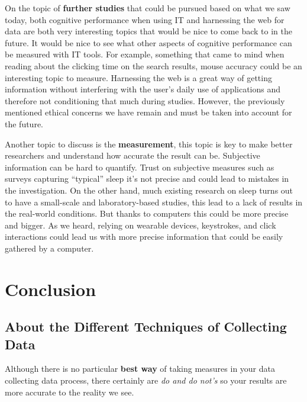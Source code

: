 \documentclass[]{IEEEtran}
\begin{document}
On the topic of \textbf{further studies} that could be pursued based on what we saw today, both cognitive performance when using IT and harnessing the web for data are both very interesting topics that would be nice to come back to in the future. It would be nice to see what other aspects of cognitive performance can be measured with IT tools. For example, something that came to mind when reading about the clicking time on the search results, mouse accuracy could be an interesting topic to measure. Harnessing the web is a great way of getting information without interfering with the user's daily use of applications and therefore not conditioning that much during studies. However, the previously mentioned ethical concerns we have remain and must be taken into account for the future. 

Another topic to discuss is the  \textbf{measurement}, this topic is key to make better researchers and understand how accurate the result can be. Subjective information can be hard to quantify. Trust on subjective measures such as surveys capturing “typical” sleep it's not precise and could lead to mistakes in the investigation. On the other hand, much existing research on sleep turns out to have a small-scale and laboratory-based studies, this lead to a lack of results in the real-world conditions. But thanks to computers this could be more precise and bigger. As we heard, relying on wearable devices, keystrokes, and click interactions could lead us with more precise information that could be easily gathered by a computer.

\section{Conclusion}

\subsection{About the Different Techniques of Collecting Data}

Although there is no particular \textbf{best way} of taking measures in your data collecting data process, there certainly are \textit{do and do not's} so your results are more accurate to the reality we see. \par
\end{document}
